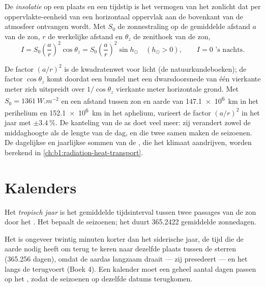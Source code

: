\begin{definition}[Insolatie]\label{def:b1:spherical-astronomy:insolation}
De \emph{insolatie} op een plaats en een tijdstip is het
vermogen van het zonlicht dat per oppervlakte-eenheid van een horizontaal
oppervlak aan de bovenkant van de atmosfeer ontvangen wordt. Met $S_0$ de
zonnestraling op de gemiddelde afstand $a$ van de zon, $r$ de werkelijke afstand
en $\theta_z$ de zenithoek van de zon,
\[
  I = S_0\left(\frac{a}{r}\right)^{2}\cos\theta_z = S_0\left(\frac{a}{r}\right)^{2}\sin h_\odot
  \quad (h_\odot > 0), \qquad I = 0 \text{ 's nachts}.
\]
\end{definition}

De factor $(a/r)^2$ is de kwadratenwet voor licht (de natuurkundeboeken); de
factor $\cos\theta_z$ komt doordat een bundel met een dwarsdoorsnede van één
vierkante meter zich uitspreidt over $1/\cos\theta_z$ vierkante meter
horizontale grond. Met $S_0 = \qty{1361}{W.m^{-2}}$ en een afstand tussen zon
en aarde van \qty{147.1e6}{km} in het perihelium en \qty{152.1e6}{km} in het
aphelium, varieert de factor $(a/r)^2$ in het jaar met $\pm\qty{3.4}{\percent}$.
De kanteling van de as doet veel meer: zij verandert zowel de middaghoogte als
de lengte van de dag, en die twee samen maken de seizoenen. De dagelijkse en
jaarlijkse sommen van de , die het klimaat aandrijven, worden berekend
in \cref{ch:b1:radiation-heat-transport}.


\section{Kalenders}

\begin{definition}\label{def:b1:spherical-astronomy:tropical-year}
Het \emph{tropisch jaar} is het gemiddelde tijdsinterval
tussen twee passages van de zon door het . Het bepaalt de seizoenen; het
duurt 365.2422 gemiddelde zonnedagen.
\end{definition}

Het  is ongeveer twintig minuten korter dan het siderische jaar, de
tijd die de aarde nodig heeft om terug te keren naar dezelfde plaats tussen de
sterren (365.256 dagen), omdat de aardas langzaam draait --- zij presedeert ---
en het  langs de  terugvoert (Boek 4). Een kalender moet een geheel aantal dagen passen op het
, zodat de seizoenen op dezelfde datums terugkomen.

